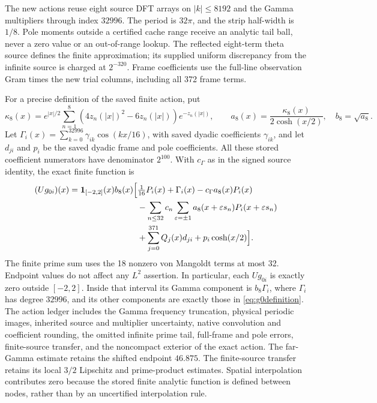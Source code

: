 \documentclass[11pt,a4paper]{article}
\numberwithin{equation}{section}
\theoremstyle{definition}\newtheorem{definition}[theorem]{Definition}
\theoremstyle{remark}\newtheorem{remark}[theorem]{Remark}
\begin{document}
The new actions reuse eight source DFT arrays on $|k|\le8192$ and the Gamma multipliers through index $32996$. The period is $32\pi$, and the strip half-width is $1/8$. Pole moments outside a certified cache range receive an analytic tail ball, never a zero value or an out-of-range lookup. The reflected eight-term theta source defines the finite approximation; its supplied uniform discrepancy from the infinite source is charged at $2^{-320}$. Frame coefficients use the full-line observation Gram times the new trial columns, including all 372 frame terms.

For a precise definition of the saved finite action, put
\[
 \kappa_8(x)=e^{|x|/2}\sum_{n=1}^{8}
 (4z_n(|x|)^2-6z_n(|x|))e^{-z_n(|x|)},\qquad
 a_8(x)=\frac{\kappa_8(x)}{2\cosh(x/2)},\quad b_8=\sqrt{a_8}.
\]
Let $\Gamma_i(x)=\sum_{k=0}^{32996}\gamma_{ik}\cos(kx/16)$, with saved dyadic coefficients $\gamma_{ik}$, and let $d_{ji}$ and $p_i$ be the saved dyadic frame and pole coefficients. All these stored coefficient numerators have denominator $2^{100}$. With $c_\Gamma$ as in the signed source identity, the exact finite function is
\begin{align}\label{eq:g0definition}
 (Ug_{0i})(x)=\mathbf1_{[-2,2]}(x)b_8(x)\Bigl[&
 \tfrac1{16}P_i(x)+\Gamma_i(x)-c_\Gamma a_8(x)P_i(x)\nonumber\\
 &-\sum_{n\le32}c_n\sum_{\varepsilon=\pm1}
 a_8(x+\varepsilon s_n)P_i(x+\varepsilon s_n)\\
 &+\sum_{j=0}^{371}Q_j(x)d_{ji}+p_i\cosh(x/2)\Bigr].\nonumber
\end{align}
The finite prime sum uses the 18 nonzero von Mangoldt terms at most 32. Endpoint values do not affect any $L^2$ assertion. In particular, each $Ug_{0i}$ is exactly zero outside $[-2,2]$. Inside that interval its Gamma component is $b_8\Gamma_i$, where $\Gamma_i$ has degree $32996$, and its other components are exactly those in \eqref{eq:g0definition}. The action ledger includes the Gamma frequency truncation, physical periodic images, inherited source and multiplier uncertainty, native convolution and coefficient rounding, the omitted infinite prime tail, full-frame and pole errors, finite-source transfer, and the noncompact exterior of the exact action. The far-Gamma estimate retains the shifted endpoint $46.875$. The finite-source transfer retains its local $3/2$ Lipschitz and prime-product estimates. Spatial interpolation contributes zero because the stored finite analytic function is defined between nodes, rather than by an uncertified interpolation rule.
\end{document}
